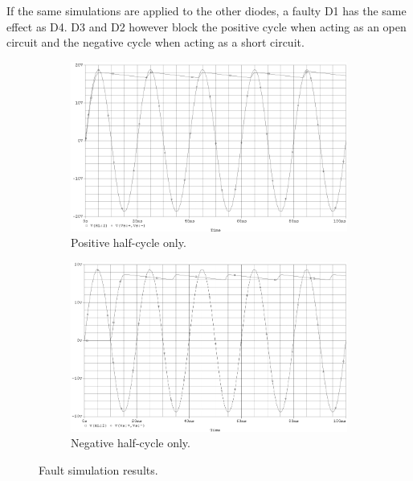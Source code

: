\documentclass[12pt]{article}
\begin{document}
If the same simulations are applied to the other diodes, a faulty D1 has the same effect as D4. D3 and D2 however block the positive cycle when acting as an open circuit and the negative cycle when acting as a short circuit.
\begin{figure}[h!]
\centering
\begin{subfigure}[b]{0.45\textwidth}
\includegraphics[width=\textwidth]{out_pos}
\caption{Positive half-cycle only.}
\label{fig:pos}
\end{subfigure}
\qquad
\begin{subfigure}[b]{0.45\textwidth}
\includegraphics[width=\textwidth]{out_neg}
\caption{Negative half-cycle only.}
\label{fig:neg}
\end{subfigure}
\caption{Fault simulation results.}
\label{fig:fault}
\end{figure}
\end{document}
